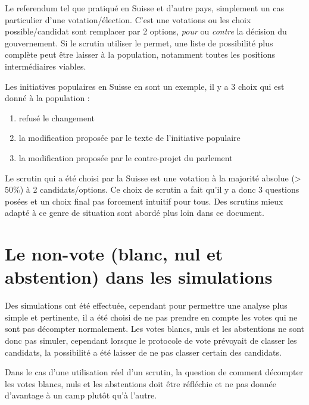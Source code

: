 \documentclass[../report]{subfiles}
\begin{document}
  Le referendum tel que pratiqué en Suisse et d'autre pays, simplement un cas particulier d'une votation/élection. 
  C'est une votations ou les choix possible/candidat sont remplacer par 2 options, \emph{pour} ou \emph{contre} la décision
  du gouvernement.
  Si le scrutin utiliser le permet, une liste de possibilité plus complète peut être laisser à la population, notamment 
  toutes les positions intermédiaires viables. 
  
  Les initiatives populaires en Suisse en sont un exemple, il y a 3 choix qui est donné à la population : 
  \begin{enumerate}
  	\item refusé le changement
  	\item la modification proposée par le texte de l'initiative populaire
  	\item la modification proposée par le contre-projet du parlement
  \end{enumerate}
  
  Le scrutin qui a été choisi par la Suisse est une votation à la majorité absolue (> 50\%) à 2 candidats/options.
  Ce choix de scrutin a fait qu'il y a donc 3 questions posées et un choix final pas forcement intuitif pour tous.
  Des scrutins mieux adapté à ce genre de situation sont abordé plus loin dans ce document.
  
  
  \section[Le non-vote dans les simulations]{Le non-vote (blanc, nul et abstention) dans les simulations}
  
  Des simulations ont été effectuée, cependant pour permettre une analyse plus simple et pertinente, il a été choisi de ne 
  pas prendre en compte les votes qui ne sont pas décompter normalement.
  Les votes blancs, nuls et les abstentions ne sont donc pas simuler, cependant lorsque le protocole de vote prévoyait de 
  classer les candidats, la possibilité a été laisser de ne pas classer certain des candidats.
  
  Dans le cas d'une utilisation réel d'un scrutin, la question de comment décompter les votes blancs, nuls et les abstentions 
  doit être réfléchie et ne pas donnée d'avantage à un camp plutôt qu'à l'autre.
  
\end{document}
